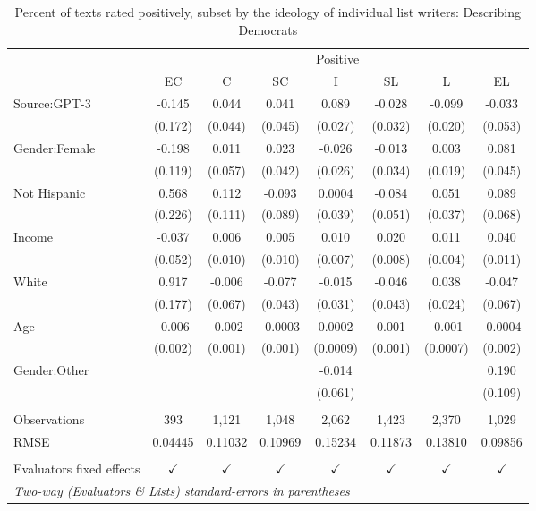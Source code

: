 \documentclass[11pt]{article}
\begin{document}
\begin{table}
\centering
%
\begin{tabular}{lccccccc}
\toprule
&\multicolumn{7}{c}{Positive}\\
& EC & C & SC & I & SL & L & EL\\
\midrule Source:GPT-3&-0.145 & 0.044 & 0.041 & 0.089 & -0.028 & -0.099 & -0.033\\
  &(0.172) & (0.044) & (0.045) & (0.027) & (0.032) & (0.020) & (0.053)\\
Gender:Female&-0.198 & 0.011 & 0.023 & -0.026 & -0.013 & 0.003 & 0.081\\
  &(0.119) & (0.057) & (0.042) & (0.026) & (0.034) & (0.019) & (0.045)\\
Not Hispanic&0.568 & 0.112 & -0.093 & 0.0004 & -0.084 & 0.051 & 0.089\\
  &(0.226) & (0.111) & (0.089) & (0.039) & (0.051) & (0.037) & (0.068)\\
Income&-0.037 & 0.006 & 0.005 & 0.010 & 0.020 & 0.011 & 0.040\\
  &(0.052) & (0.010) & (0.010) & (0.007) & (0.008) & (0.004) & (0.011)\\
White&0.917 & -0.006 & -0.077 & -0.015 & -0.046 & 0.038 & -0.047\\
  &(0.177) & (0.067) & (0.043) & (0.031) & (0.043) & (0.024) & (0.067)\\
Age&-0.006 & -0.002 & -0.0003 & 0.0002 & 0.001 & -0.001 & -0.0004\\
  &(0.002) & (0.001) & (0.001) & (0.0009) & (0.001) & (0.0007) & (0.002)\\
Gender:Other&   &    &    & -0.014 &    &    & 0.190\\
  &   &    &    & (0.061) &    &    & (0.109)\\
 &  & & & & & & \\
Observations & 393&1,121&1,048&2,062&1,423&2,370&1,029\\
RMSE & 0.04445&0.11032&0.10969&0.15234&0.11873&0.13810&0.09856\\
 &   &   &   &   &   &   &  \\
Evaluators fixed effects & $\checkmark$ & $\checkmark$ & $\checkmark$ & $\checkmark$ & $\checkmark$ & $\checkmark$ & $\checkmark$\\
\bottomrule
\multicolumn{8}{l}{\emph{Two-way (Evaluators \& Lists) standard-errors in parentheses}}\\
\end{tabular}
%
\caption{Percent of texts rated positively, subset by the ideology of individual list writers: Describing Democrats}
\label{tab:f4a2}
\end{table}
\end{document}

